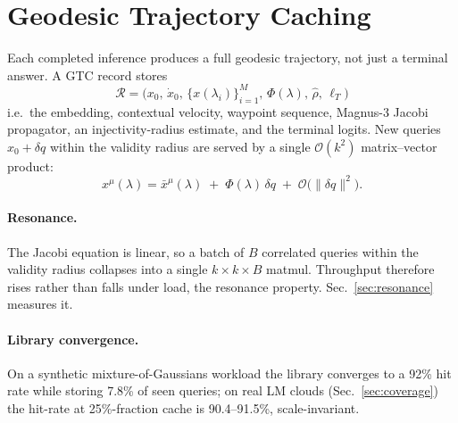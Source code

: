 \documentclass[11pt]{article}
\begin{document}
\section{Geodesic Trajectory Caching}
\label{sec:gtc}

Each completed inference produces a full geodesic trajectory, not just a
terminal answer. A GTC record stores
\begin{equation*}
\mathcal{R} = \bigl(x_0,\,\dot x_0,\,\{x(\lambda_i)\}_{i=1}^M,\,\Phi(\lambda),\,\hat\rho,\,\ell_T\bigr)
\end{equation*}
i.e.\ the embedding, contextual velocity, waypoint sequence, Magnus-3 Jacobi
propagator, an injectivity-radius estimate, and the terminal logits. New queries
$x_0+\delta q$ within the validity radius are served by a single
$\mathcal{O}(k^2)$ matrix--vector product:
\begin{equation}
x^\mu(\lambda) = \bar x^\mu(\lambda) \;+\; \Phi(\lambda)\,\delta q \;+\;
\mathcal{O}\bigl(\|\delta q\|^2\bigr).
\label{eq:gtc-correction}
\end{equation}

\paragraph{Resonance.} The Jacobi equation is linear, so a batch of $B$
correlated queries within the validity radius collapses into a single
$k\times k\times B$ matmul. Throughput therefore rises rather than falls
under load, the resonance property. Sec.~\ref{sec:resonance} measures it.

\paragraph{Library convergence.} On a synthetic mixture-of-Gaussians workload
the library converges to a 92\% hit rate while storing 7.8\% of seen queries;
on real LM clouds (Sec.~\ref{sec:coverage}) the hit-rate at 25\%-fraction cache
is 90.4--91.5\%, scale-invariant.
\end{document}

